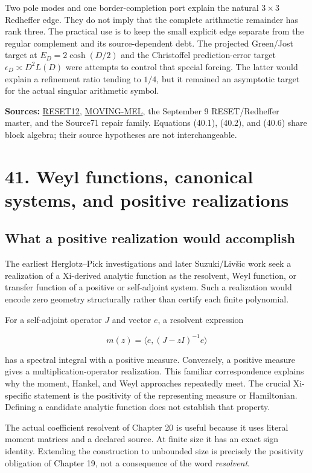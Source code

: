 \documentclass[
  10pt,
  a4paper,
  10pt,
  oneside,
  openany]{book}
\begin{document}
Two pole modes and one border-completion port explain the natural
\(3\times3\) Redheffer edge. They do not imply that the complete
arithmetic remainder has rank three. The practical use is to keep the
small explicit edge separate from the regular complement and its
source-dependent debt. The projected Green/Jost target at
\(E_D=2\cosh(D/2)\) and the Christoffel prediction-error target
\(\epsilon_D\asymp D^2L(D)\) were attempts to control that special
forcing. The latter would explain a refinement ratio tending to \(1/4\),
but it remained an asymptotic target for the actual singular arithmetic
symbol.

\textbf{Sources:} \hyperref[source-reset12]{RESET12},
\hyperref[source-moving-mel]{MOVING-MEL}, the September 9
RESET/Redheffer master, and the Source71 repair family. Equations
(40.1), (40.2), and (40.6) share block algebra; their source hypotheses
are not interchangeable.

\section{41. Weyl functions, canonical systems, and positive
realizations}\label{ch-spectral}

\subsection{What a positive realization would
accomplish}\label{what-a-positive-realization-would-accomplish}

The earliest Herglotz--Pick investigations and later Suzuki/Livšic work
seek a realization of a Xi-derived analytic function as the resolvent,
Weyl function, or transfer function of a positive or self-adjoint
system. Such a realization would encode zero geometry structurally
rather than certify each finite polynomial.

For a self-adjoint operator \(J\) and vector \(e\), a resolvent
expression

\[
 m(z)=\langle e,(J-zI)^{-1}e\rangle
\]

has a spectral integral with a positive measure. Conversely, a positive
measure gives a multiplication-operator realization. This familiar
correspondence explains why the moment, Hankel, and Weyl approaches
repeatedly meet. The crucial Xi-specific statement is the positivity of
the representing measure or Hamiltonian. Defining a candidate analytic
function does not establish that property.

The actual coefficient resolvent of Chapter 20 is useful because it uses
literal moment matrices and a declared source. At finite size it has an
exact sign identity. Extending the construction to unbounded size is
precisely the positivity obligation of Chapter 19, not a consequence of
the word \emph{resolvent}.
\end{document}
